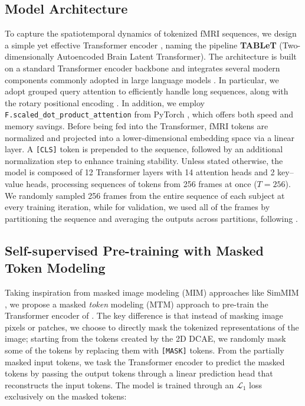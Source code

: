 \subsection{{\ours} Model Architecture}
To capture the spatiotemporal dynamics of tokenized fMRI sequences, we design a simple yet effective Transformer encoder \citep{attention}, naming the pipeline \textbf{TABLeT} (Two-dimensionally Autoencoded Brain Latent Transformer).
The architecture is built on a standard Transformer encoder backbone and integrates several modern components commonly adopted in large language models \citep{qwen2.5, llama3}. In particular, we adopt grouped query attention \citep{GQA} to efficiently handle long sequences, along with the rotary positional encoding \citep{RoPE}.
In addition, we employ \texttt{F.scaled\_dot\_product\_attention} from PyTorch \citep{pytorch}, which offers both speed and memory savings.
Before being fed into the Transformer, fMRI tokens are normalized and projected into a lower-dimensional embedding space via a linear layer. A \texttt{[CLS]} token is prepended to the sequence, followed by an additional normalization step to enhance training stability.
Unless stated otherwise, the model is composed of 12 Transformer layers with 14 attention heads and 2 key–value heads, processing sequences of tokens from 256 frames at once ($T=256$).
We randomly sampled 256 frames from the entire sequence of each subject at every training iteration, while for validation, we used all of the frames by partitioning the sequence and averaging the outputs across partitions, following \citet{swift}.

\subsection{Self-supervised Pre-training with Masked Token Modeling}
\label{sec:masked_pretrain}
Taking inspiration from masked image modeling (MIM) approaches like SimMIM \citep{simmim}, we propose a masked \textit{token} modeling (MTM) approach to pre-train the Transformer encoder of {\ours}. The key difference is that instead of masking image pixels or patches, we choose to directly mask the tokenized representations of the image;
starting from the tokens created by the 2D DCAE, we randomly mask some of the tokens by replacing them with \texttt{[MASK]} tokens. From the partially masked input tokens, we task the Transformer encoder to predict the masked tokens by passing the output tokens through a linear prediction head that reconstructs the input tokens. The model is trained through an $\mathcal{L}_1$ loss exclusively on the masked tokens:

